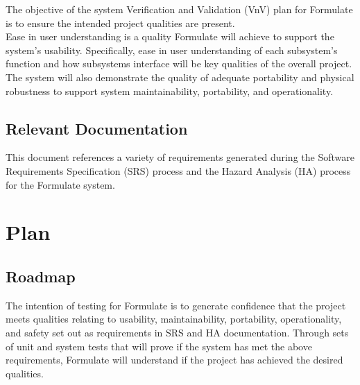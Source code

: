 \documentclass[12pt, titlepage]{article}
\begin{document}
  The objective of the system Verification and Validation (VnV) plan for Formulate is to ensure the intended project qualities are present.\\

  Ease in user understanding is a quality Formulate will achieve to support the system's usability.  Specifically, ease in user understanding of each subsystem's function and how subsystems interface will be key qualities of the overall project.\\

  The system will also demonstrate the quality of adequate portability and physical robustness to support system maintainability, portability, and operationality.\\



\subsection{Relevant Documentation}



  This document references a variety of requirements generated during the Software Requirements Specification (SRS) process and the Hazard Analysis (HA) process for the Formulate system. \\


\newpage
\section{Plan}

  
  \subsection{Roadmap}

  The intention of testing for Formulate is to generate confidence that the project meets qualities relating to usability, maintainability, portability, operationality, and safety set out as requirements in SRS and HA documentation. Through sets of unit and system tests that will prove if the system has met the above requirements, Formulate will understand if the project has achieved the desired qualities.\\
\end{document}
